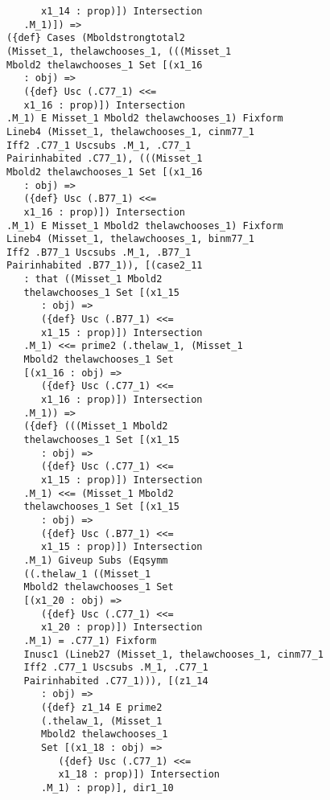 \documentclass[12pt]{article}
\begin{document}
\begin{verbatim}
                   x1_14 : prop)]) Intersection 
                .M_1)]) => 
             ({def} Cases (Mboldstrongtotal2 
             (Misset_1, thelawchooses_1, (((Misset_1 
             Mbold2 thelawchooses_1 Set [(x1_16 
                : obj) => 
                ({def} Usc (.C77_1) <<= 
                x1_16 : prop)]) Intersection 
             .M_1) E Misset_1 Mbold2 thelawchooses_1) Fixform 
             Lineb4 (Misset_1, thelawchooses_1, cinm77_1 
             Iff2 .C77_1 Uscsubs .M_1, .C77_1 
             Pairinhabited .C77_1), (((Misset_1 
             Mbold2 thelawchooses_1 Set [(x1_16 
                : obj) => 
                ({def} Usc (.B77_1) <<= 
                x1_16 : prop)]) Intersection 
             .M_1) E Misset_1 Mbold2 thelawchooses_1) Fixform 
             Lineb4 (Misset_1, thelawchooses_1, binm77_1 
             Iff2 .B77_1 Uscsubs .M_1, .B77_1 
             Pairinhabited .B77_1)), [(case2_11 
                : that ((Misset_1 Mbold2 
                thelawchooses_1 Set [(x1_15 
                   : obj) => 
                   ({def} Usc (.B77_1) <<= 
                   x1_15 : prop)]) Intersection 
                .M_1) <<= prime2 (.thelaw_1, (Misset_1 
                Mbold2 thelawchooses_1 Set 
                [(x1_16 : obj) => 
                   ({def} Usc (.C77_1) <<= 
                   x1_16 : prop)]) Intersection 
                .M_1)) => 
                ({def} (((Misset_1 Mbold2 
                thelawchooses_1 Set [(x1_15 
                   : obj) => 
                   ({def} Usc (.C77_1) <<= 
                   x1_15 : prop)]) Intersection 
                .M_1) <<= (Misset_1 Mbold2 
                thelawchooses_1 Set [(x1_15 
                   : obj) => 
                   ({def} Usc (.B77_1) <<= 
                   x1_15 : prop)]) Intersection 
                .M_1) Giveup Subs (Eqsymm 
                ((.thelaw_1 ((Misset_1 
                Mbold2 thelawchooses_1 Set 
                [(x1_20 : obj) => 
                   ({def} Usc (.C77_1) <<= 
                   x1_20 : prop)]) Intersection 
                .M_1) = .C77_1) Fixform 
                Inusc1 (Lineb27 (Misset_1, thelawchooses_1, cinm77_1 
                Iff2 .C77_1 Uscsubs .M_1, .C77_1 
                Pairinhabited .C77_1))), [(z1_14 
                   : obj) => 
                   ({def} z1_14 E prime2 
                   (.thelaw_1, (Misset_1 
                   Mbold2 thelawchooses_1 
                   Set [(x1_18 : obj) => 
                      ({def} Usc (.C77_1) <<= 
                      x1_18 : prop)]) Intersection 
                   .M_1) : prop)], dir1_10 

\end{verbatim}
\end{document}
